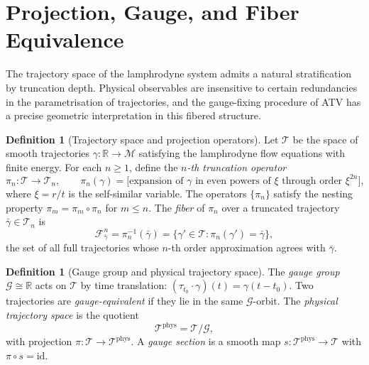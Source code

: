 \documentclass[12pt,a4paper]{article}
\theoremstyle{plain}
\theoremstyle{definition}
\newtheorem{definition}[theorem]{Definition}
\theoremstyle{remark}
\newcommand{\Tacc}{\mathcal{T}}
\newcommand{\Ggroup}{\mathcal{G}}
\newcommand{\piproj}{\pi}
\newcommand{\Ffam}{\mathcal{F}}
\begin{document}
\section{Projection, Gauge, and Fiber Equivalence}
\label{sec:gauge}

The trajectory space of the lamphrodyne system admits a natural stratification by
truncation depth. Physical observables are insensitive to certain redundancies in
the parametrisation of trajectories, and the gauge-fixing procedure of ATV has a
precise geometric interpretation in this fibered structure.

\begin{definition}[Trajectory space and projection operators]
\label{def:traj_proj}
Let $\Tacc$ be the space of smooth trajectories $\gamma:\mathbb{R}\to\mathcal{M}$
satisfying the lamphrodyne flow equations with finite energy. For each $n\geq 1$,
define the \emph{$n$-th truncation operator}
\begin{equation}
  \piproj_n:\Tacc\to\Tacc_n,
  \qquad
  \piproj_n(\gamma) = \bigl[\text{expansion of }\gamma
                       \text{ in even powers of }\xi\text{ through order }\xi^{2n}\bigr],
  \label{eq:proj_def}
\end{equation}
where $\xi = r/t$ is the self-similar variable. The operators $\{\piproj_n\}$ satisfy
the nesting property $\piproj_m = \piproj_m \circ \piproj_n$ for $m\leq n$. The
\emph{fiber} of $\piproj_n$ over a truncated trajectory $\bar\gamma\in\Tacc_n$ is
\begin{equation}
  \Ffam_{\bar\gamma}^n
  = \piproj_n^{-1}(\bar\gamma)
  = \{\gamma'\in\Tacc : \piproj_n(\gamma') = \bar\gamma\},
  \label{eq:fiber_def}
\end{equation}
the set of all full trajectories whose $n$-th order approximation agrees with $\bar\gamma$.
\end{definition}

\begin{definition}[Gauge group and physical trajectory space]
\label{def:gauge_group}
The \emph{gauge group} $\Ggroup \cong \mathbb{R}$ acts on $\Tacc$ by time translation:
$(\tau_{t_0}\cdot\gamma)(t) = \gamma(t - t_0)$. Two trajectories are
\emph{gauge-equivalent} if they lie in the same $\Ggroup$-orbit. The
\emph{physical trajectory space} is the quotient
\begin{equation}
  \Tacc^{\mathrm{phys}} = \Tacc/\Ggroup,
  \label{eq:phys_space}
\end{equation}
with projection $\piproj:\Tacc\to\Tacc^{\mathrm{phys}}$. A \emph{gauge section} is
a smooth map $s:\Tacc^{\mathrm{phys}}\to\Tacc$ with $\piproj\circ s = \mathrm{id}$.
\end{definition}
\end{document}
